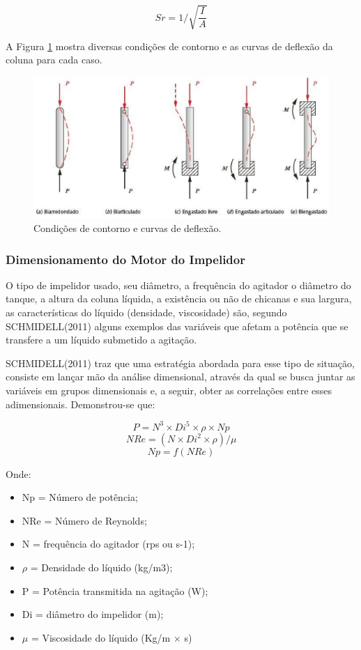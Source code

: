 \[Sr = 1/\sqrt{\frac{I}{A}}\]

A Figura \ref{solda} mostra diversas condições de contorno e as curvas de deflexão da coluna para cada caso.

\begin{figure}[h]
 \centering
 \includegraphics[keepaspectratio=true,scale=0.5]{figuras/solda.eps}
 \caption{Condições de contorno e curvas de deflexão.}
 \label{solda}
\end{figure}

\subsubsection{Dimensionamento do Motor do Impelidor}

O tipo de impelidor usado, seu diâmetro, a frequência do agitador o diâmetro do tanque, a altura da coluna líquida, a existência ou não de chicanas e sua largura, as características do líquido (densidade, viscosidade) são, segundo SCHMIDELL(2011) alguns exemplos das variáveis que afetam a potência que se transfere a um líquido submetido a agitação.

SCHMIDELL(2011) traz que uma estratégia  abordada para esse tipo de situação, consiste em lançar mão da análise dimensional, através da qual se busca juntar as variáveis em grupos dimensionais e, a seguir, obter as correlações entre esses adimensionais. Demonstrou-se que:

\[P = N^3  \times Di^5 \times \rho \times Np\]
\[NRe = (N \times Di^2 \times \rho)/\mu\]
\[Np = f(NRe)\]

Onde:
\begin{itemize}
	\item Np = Número de potência;
	\item NRe = Número de Reynolds;
	\item N = frequência do agitador (rps ou s-1);
	\item \(\rho\) = Densidade do líquido (kg/m3);
	\item P = Potência transmitida na agitação (W);
	\item Di = diâmetro do impelidor (m);
	\item \(\mu\) = Viscosidade do líquido (Kg/m \(\times\) s)
\end{itemize}

